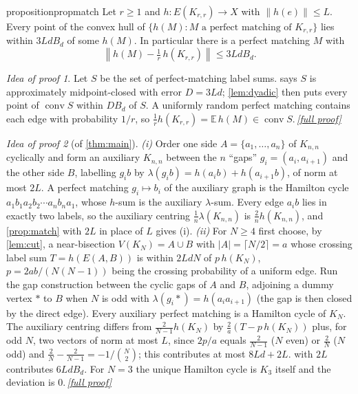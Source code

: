 \documentclass[11pt,a4paper]{article}
\theoremstyle{plain}
\theoremstyle{definition}
\theoremstyle{remark}
\newtheorem*{proofidea}{Idea of proof}
\newcommand{\fullproofref}[1]{\,\hyperref[#1]{\textit{[full proof]}}}
\newcommand{\E}{\mathbb E}
\newcommand{\conv}{\operatorname{conv}}
\newcommand{\norm}[1]{\left\|#1\right\|}
\begin{document}
\begin{restatable}{proposition}{propmatch}\label{prop:match}
Let $r\ge1$ and $h\colon E(K_{r,r})\to X$ with $\|h(e)\|\le L$. Every point of the convex hull of $\{h(M):M\text{ a perfect matching of }K_{r,r}\}$ lies within $3LdB_d$ of some $h(M)$. In particular there is a perfect matching $M$ with
\[
 \norm{h(M)-\tfrac1r\,h(K_{r,r})}\le 3LdB_d .
\]
\end{restatable}
\begin{proofidea}
Let $S$ be the set of perfect-matching label sums.  says $S$ is approximately midpoint-closed with error $D=3Ld$; \cref{lem:dyadic} then puts every point of $\conv S$ within $DB_d$ of $S$. A uniformly random perfect matching contains each edge with probability $1/r$, so $\frac1rh(K_{r,r})=\E\,h(M)\in\conv S$.\fullproofref{pf:match}
\end{proofidea}

\begin{proofidea}[of \cref{thm:main}]
\emph{(i)} Order one side $A=\{a_1,\dots,a_n\}$ of $K_{n,n}$ cyclically and form an auxiliary $K_{n,n}$ between the $n$ ``gaps'' $g_i=(a_i,a_{i+1})$ and the other side $B$, labelling $g_ib$ by $\lambda(g_ib)=h(a_ib)+h(a_{i+1}b)$, of norm at most $2L$. A perfect matching $g_i\mapsto b_i$ of the auxiliary graph is the Hamilton cycle $a_1b_1a_2b_2\cdots a_nb_na_1$, whose $h$-sum is the auxiliary $\lambda$-sum. Every edge $a_ib$ lies in exactly two labels, so the auxiliary centring $\frac1n\lambda(K_{n,n})$ is $\frac2nh(K_{n,n})$, and \cref{prop:match} with $2L$ in place of $L$ gives (i).
\emph{(ii)} For $N\ge4$ first choose, by \cref{lem:cut}, a near-bisection $V(K_N)=A\cup B$ with $|A|=\lceil N/2\rceil=a$ whose crossing label sum $T=h(E(A,B))$ is within $2LdN$ of $p\,h(K_N)$, $p=2ab/(N(N-1))$ being the crossing probability of a uniform edge. Run the gap construction between the cyclic gaps of $A$ and $B$, adjoining a dummy vertex $\ast$ to $B$ when $N$ is odd with $\lambda(g_i\ast)=h(a_ia_{i+1})$ (the gap is then closed by the direct edge). Every auxiliary perfect matching is a Hamilton cycle of $K_N$. The auxiliary centring differs from $\frac2{N-1}h(K_N)$ by $\frac2a(T-p\,h(K_N))$ plus, for odd $N$, two vectors of norm at most $L$, since $2p/a$ equals $\frac2{N-1}$ ($N$ even) or $\frac2N$ ($N$ odd) and $\frac2N-\frac2{N-1}=-1/\binom N2$; this contributes at most $8Ld+2L$.  with $2L$ contributes $6LdB_d$. For $N=3$ the unique Hamilton cycle is $K_3$ itself and the deviation is $0$.\fullproofref{pf:main}
\end{proofidea}
\end{document}
